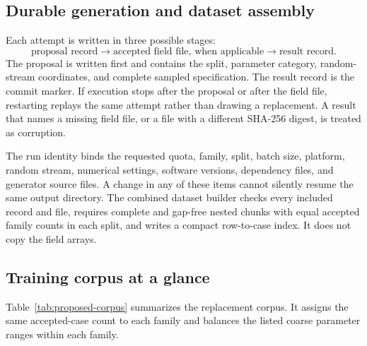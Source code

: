 \documentclass[11pt]{article}
\begin{document}
\subsection{Durable generation and dataset assembly}

Each attempt is written in three possible stages:
\[
  \text{proposal record}
  \longrightarrow
  \text{accepted field file, when applicable}
  \longrightarrow
  \text{result record}.
\]
The proposal is written first and contains the split, parameter category, random-stream
coordinates, and complete sampled specification.  The result record is the
commit marker.  If execution stops after the proposal or after the field
file, restarting replays the same attempt rather than drawing a replacement.
A result that names a missing field file, or a file with a different
SHA-256 digest, is treated as corruption.

The run identity binds the requested quota, family, split, batch size,
platform, random stream, numerical settings, software versions, dependency
files, and generator source files.  A change in any of these items cannot
silently resume the same output directory.  The combined dataset builder
checks every included record and file, requires complete and gap-free nested
chunks with equal accepted family counts in each split, and writes a compact
row-to-case index.  It does not copy the field arrays.

\subsection{Training corpus at a glance}

Table~\ref{tab:proposed-corpus} summarizes the replacement corpus.  It assigns
the same accepted-case count to each family and balances the listed coarse
parameter ranges within each family.
\end{document}
